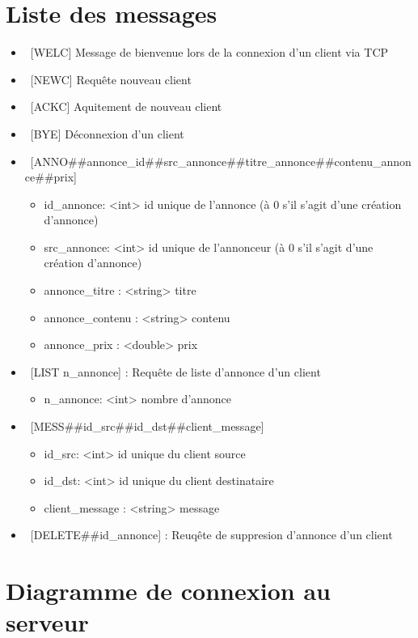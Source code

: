 \documentclass[12pt]{article}
\begin{document}
\section{Liste des messages}

\begin{itemize}
  \item~[WELC] Message de bienvenue lors de la connexion d'un client via TCP
  \item~[NEWC] Requête nouveau client
  \item~[ACKC] Aquitement de nouveau client
  \item~[BYE]  Déconnexion d'un client
  \item~[ANNO\#\#annonce\_id\#\#src\_annonce\#\#titre\_annonce\#\#contenu\_annonce\#\#prix]
  \begin{itemize}
    \item id\_annonce: <int>  id unique de l'annonce (à 0 s'il s'agit d'une création d'annonce)
    \item src\_annonce: <int> id unique de l'annonceur (à 0 s'il s'agit d'une création d'annonce)
    \item annonce\_titre : <string> titre
    \item annonce\_contenu : <string> contenu
    \item annonce\_prix : <double> prix
  \end{itemize}
  \item~[LIST n\_annonce] : Requête de liste d'annonce d'un client
  \begin{itemize}
    \item n\_annonce: <int> nombre d'annonce
  \end{itemize}
  \item~[MESS\#\#id\_src\#\#id\_dst\#\#client\_message]
  \begin{itemize}
    \item id\_src: <int> id unique du client source
    \item id\_dst: <int> id unique du client destinataire
    \item client\_message : <string> message
  \end{itemize}
  \item~[DELETE\#\#id\_annonce] : Reuqête de suppresion d'annonce d'un client
\end{itemize}


\section{Diagramme de connexion au serveur}
\end{document}
